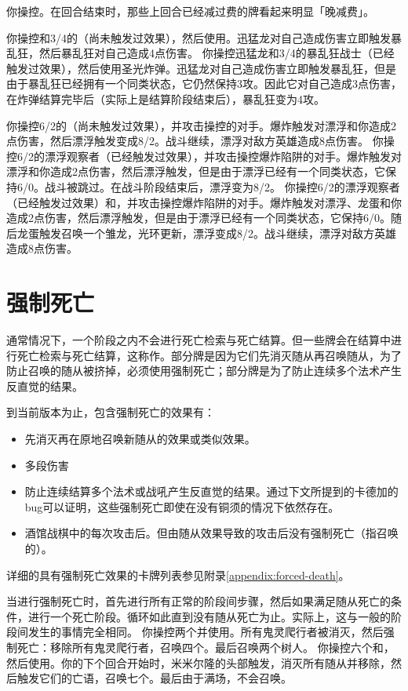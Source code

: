 \example 你操控。在回合结束时，那些上回合已经减过费的牌看起来明显「晚减费」。

\example 你操控和3/4的（尚未触发过效果），然后使用。迅猛龙对自己造成伤害立即触发暴乱狂，然后暴乱狂对自己造成4点伤害。
\example 你操控迅猛龙和3/4的暴乱狂战士（已经触发过效果），然后使用圣光炸弹。迅猛龙对自己造成伤害立即触发暴乱狂，但是由于暴乱狂已经拥有一个同类状态，它仍然保持3攻。因此它对自己造成3点伤害，在炸弹结算完毕后（实际上是结算阶段结束后），暴乱狂变为4攻。

\example 你操控6/2的（尚未触发过效果），并攻击操控的对手。爆炸触发对漂浮和你造成2点伤害，然后漂浮触发变成8/2。战斗继续，漂浮对敌方英雄造成8点伤害。
\example 你操控6/2的漂浮观察者（已经触发过效果），并攻击操控爆炸陷阱的对手。爆炸触发对漂浮和你造成2点伤害，然后漂浮触发，但是由于漂浮已经有一个同类状态，它保持6/0。战斗被跳过。在战斗阶段结束后，漂浮变为8/2。
\example 你操控6/2的漂浮观察者（已经触发过效果）和，并攻击操控爆炸陷阱的对手。爆炸触发对漂浮、龙蛋和你造成2点伤害，然后漂浮触发，但是由于漂浮已经有一个同类状态，它保持6/0。随后龙蛋触发召唤一个雏龙，光环更新，漂浮变成8/2。战斗继续，漂浮对敌方英雄造成8点伤害。

\section{强制死亡}

通常情况下，一个阶段之内不会进行死亡检索与死亡结算。但一些牌会在结算中进行死亡检索与死亡结算，这称作。部分牌是因为它们先消灭随从再召唤随从，为了防止召唤的随从被挤掉，必须使用强制死亡；部分牌是为了防止连续多个法术产生反直觉的结果。

到当前版本为止，包含强制死亡的效果有：
\begin{itemize}
    \item 先消灭再在原地召唤新随从的效果或类似效果。
    \item 多段伤害
    \item 防止连续结算多个法术或战吼产生反直觉的结果。通过下文所提到的卡德加的bug可以证明，这些强制死亡即使在没有铜须的情况下依然存在。
    \item 酒馆战棋中的每次攻击后。但由随从效果导致的攻击后没有强制死亡（指召唤的）。
\end{itemize}
详细的具有强制死亡效果的卡牌列表参见附录\ref{appendix:forced-death}。

当进行强制死亡时，首先进行所有正常的阶段间步骤，然后如果满足随从死亡的条件，进行一个死亡阶段。循环如此直到没有随从死亡为止。实际上，这与一般的阶段间发生的事情完全相同。
\example 你操控两个并使用。所有鬼灵爬行者被消灭，然后强制死亡：移除所有鬼灵爬行者，召唤四个。最后召唤两个树人。
\example 你操控六个和，然后使用。你的下个回合开始时，米米尔隆的头部触发，消灭所有随从并移除，然后触发它们的亡语，召唤七个。最后由于满场，不会召唤。

